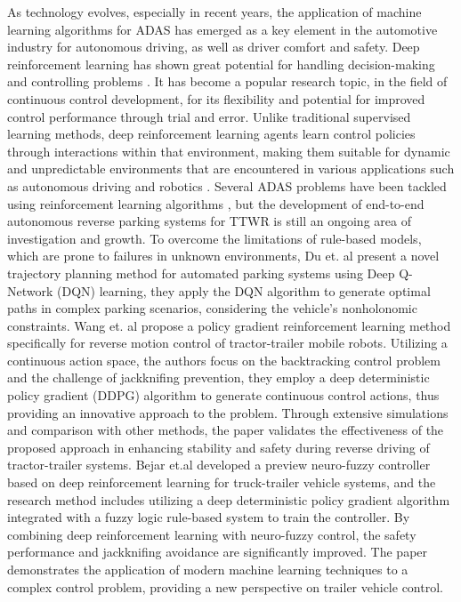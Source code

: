 As technology evolves, especially in recent years, the application of machine learning algorithms for ADAS has emerged as a key element in the automotive industry for autonomous driving, as well as driver comfort and safety. Deep reinforcement learning has shown great potential for handling decision-making and controlling problems \parencite{ye2020automated}. It has become a popular research topic, in the field of continuous control development, for its flexibility and potential for improved control performance through trial and error. Unlike traditional supervised learning methods, deep reinforcement learning agents learn control policies through interactions within that environment, making them suitable for dynamic and unpredictable environments that are encountered in various applications such as autonomous driving and robotics \parencite{brunton2022data}. Several ADAS problems have been tackled using reinforcement learning algorithms \parencite{chen2019crowd}\parencite{du2020trajectory}\parencite{jaritz2018end}, but the development of end-to-end autonomous reverse parking systems for TTWR is still an ongoing area of investigation and growth. To overcome the limitations of rule-based models, which are prone to failures in unknown environments, Du et. al \parencite{du2020trajectory} present a novel trajectory planning method for automated parking systems using Deep Q-Network (DQN) learning, they apply the DQN algorithm to generate optimal paths in complex parking scenarios, considering the vehicle's nonholonomic constraints. Wang et. al \parencite{wang2021policy} propose a policy gradient reinforcement learning method specifically for reverse motion control of tractor-trailer mobile robots. Utilizing a continuous action space, the authors focus on the backtracking control problem and the challenge of jackknifing prevention, they employ a deep deterministic policy gradient (DDPG) algorithm to generate continuous control actions, thus providing an innovative approach to the problem. Through extensive simulations and comparison with other methods, the paper validates the effectiveness of the proposed approach in enhancing stability and safety during reverse driving of tractor-trailer systems. Bejar et.al \parencite{bejar2019preview} developed a preview neuro-fuzzy controller based on deep reinforcement learning for truck-trailer vehicle systems, and the research method includes utilizing a deep deterministic policy gradient algorithm integrated with a fuzzy logic rule-based system to train the controller. By combining deep reinforcement learning with neuro-fuzzy control, the safety performance and jackknifing avoidance are significantly improved. The paper demonstrates the application of modern machine learning techniques to a complex control problem, providing a new perspective on trailer vehicle control.

